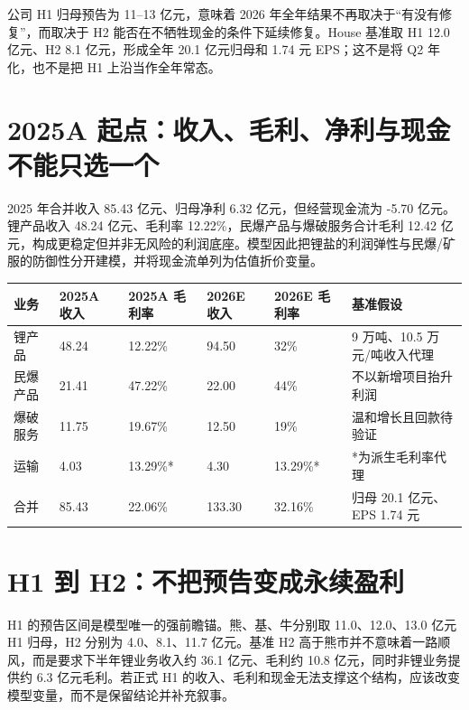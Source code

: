 \begin{houseviewbox}
公司 H1 归母预告为 11--13 亿元，意味着 2026 年全年结果不再取决于“有没有修复”，而取决于 H2 能否在不牺牲现金的条件下延续修复。House 基准取 H1 12.0 亿元、H2 8.1 亿元，形成全年 20.1 亿元归母和 1.74 元 EPS；这不是将 Q2 年化，也不是把 H1 上沿当作全年常态。
\end{houseviewbox}

\section{2025A 起点：收入、毛利、净利与现金不能只选一个}

2025 年合并收入 85.43 亿元、归母净利 6.32 亿元，但经营现金流为 -5.70 亿元。锂产品收入 48.24 亿元、毛利率 12.22\%，民爆产品与爆破服务合计毛利 12.42 亿元，构成更稳定但并非无风险的利润底座。模型因此把锂盐的利润弹性与民爆/矿服的防御性分开建模，并将现金流单列为估值折价变量。

\begin{exhibitbox}
\begin{tabularx}{\exhibitboxwidth}{L{2.8cm}R{1.8cm}R{1.7cm}R{1.8cm}R{1.9cm}X}
\toprule
业务 & 2025A 收入 & 2025A 毛利率 & 2026E 收入 & 2026E 毛利率 & 基准假设 \\
\midrule
锂产品 & 48.24 & 12.22\% & 94.50 & 32\% & 9 万吨、10.5 万元/吨收入代理 \\
民爆产品 & 21.41 & 47.22\% & 22.00 & 44\% & 不以新增项目抬升利润 \\
爆破服务 & 11.75 & 19.67\% & 12.50 & 19\% & 温和增长且回款待验证 \\
运输 & 4.03 & 13.29\%* & 4.30 & 13.29\%* & *为派生毛利率代理 \\
合并 & 85.43 & 22.06\% & 133.30 & 32.16\% & 归母 20.1 亿元、EPS 1.74 元 \\
\bottomrule
\end{tabularx}
\end{exhibitbox}

\section{H1 到 H2：不把预告变成永续盈利}

H1 的预告区间是模型唯一的强前瞻锚。熊、基、牛分别取 11.0、12.0、13.0 亿元 H1 归母，H2 分别为 4.0、8.1、11.7 亿元。基准 H2 高于熊市并不意味着一路顺风，而是要求下半年锂业务收入约 36.1 亿元、毛利约 10.8 亿元，同时非锂业务提供约 6.3 亿元毛利。若正式 H1 的收入、毛利和现金无法支撑这个结构，应该改变模型变量，而不是保留结论并补充叙事。

